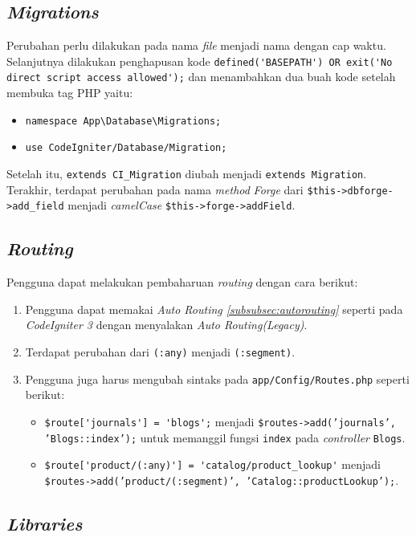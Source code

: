 \subsection{\textit{Migrations}}

Perubahan perlu dilakukan pada nama \textit{file} menjadi nama dengan cap waktu. Selanjutnya dilakukan penghapusan kode \verb|defined('BASEPATH') OR exit('No direct script access allowed');| dan menambahkan dua buah kode setelah membuka tag PHP yaitu:
\begin{itemize}
	\item \verb|namespace App\Database\Migrations;|
	\item \texttt{use CodeIgniter/Database/Migration;}
\end{itemize}
  Setelah itu, \verb|extends CI_Migration| diubah menjadi \verb|extends Migration|. Terakhir, terdapat perubahan pada nama \textit{method} \textit{Forge} dari \verb|$this->dbforge->add_field| menjadi \textit{camelCase} \verb|$this->forge->addField|.

\subsection{\textit{Routing}}

Pengguna dapat melakukan pembaharuan \textit{routing} dengan cara berikut:
\begin{enumerate}
\item Pengguna dapat memakai \textit{Auto Routing \ref{subsubsec:autorouting}} seperti pada \textit{CodeIgniter 3} dengan menyalakan \textit{Auto Routing(Legacy)}.
\item Terdapat perubahan dari \verb|(:any)| menjadi \verb|(:segment)|.
\item Pengguna juga harus mengubah sintaks pada \verb|app/Config/Routes.php| seperti berikut:
	\begin{itemize}
	\item \verb|$route['journals'] = 'blogs';| menjadi \texttt{\$routes->add('journals', 'Blogs::index');} untuk memanggil fungsi \texttt{index} pada \textit{controller} \texttt{Blogs}.
	\item \verb|$route['product/(:any)'] = 'catalog/product_lookup'| menjadi \texttt{\$routes->add('product/(:segment)', 'Catalog::productLookup');}.
	\end{itemize}
\end{enumerate}

\subsection{\textit{Libraries}}
 

